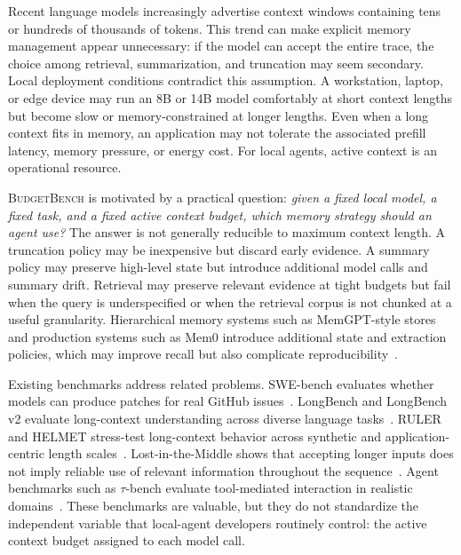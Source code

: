 \documentclass[11pt]{article}
\newcommand{\BudgetBench}{\textsc{BudgetBench}}
\begin{document}
Recent language models increasingly advertise context windows containing tens
or hundreds of thousands of tokens.  This trend can make explicit memory
management appear unnecessary: if the model can accept the entire trace, the
choice among retrieval, summarization, and truncation may seem secondary.
Local deployment conditions contradict this assumption.  A workstation,
laptop, or edge device may run an 8B or 14B model comfortably at short context
lengths but become slow or memory-constrained at longer lengths.  Even when a
long context fits in memory, an application may not tolerate the associated
prefill latency, memory pressure, or energy cost.  For local agents, active
context is an operational resource.

\BudgetBench{} is motivated by a practical question: \emph{given a fixed local
model, a fixed task, and a fixed active context budget, which memory strategy
should an agent use?}  The answer is not generally reducible to maximum context
length.  A truncation policy may be inexpensive but discard early evidence.  A
summary policy may preserve high-level state but introduce additional model
calls and summary drift.  Retrieval may preserve relevant evidence at tight
budgets but fail when the query is underspecified or when the retrieval corpus
is not chunked at a useful granularity.  Hierarchical memory systems such as
MemGPT-style stores and production systems such as Mem0 introduce additional
state and extraction policies, which may improve recall but also complicate
reproducibility~\citep{packer2023memgpt,chhikara2025mem0}.

Existing benchmarks address related problems.  SWE-bench evaluates whether
models can produce patches for real GitHub issues~\citep{jimenez2023swebench}.
LongBench and LongBench v2 evaluate long-context understanding across diverse
language tasks~\citep{bai2023longbench,bai2024longbenchv2}.  RULER and HELMET
stress-test long-context behavior across synthetic and application-centric
length scales~\citep{hsieh2024ruler,yen2024helmet}.  Lost-in-the-Middle shows
that accepting longer inputs does not imply reliable use of relevant
information throughout the sequence~\citep{liu2023lost}.  Agent benchmarks such
as $\tau$-bench evaluate tool-mediated interaction in realistic
domains~\citep{yao2024taubench}.  These benchmarks are valuable, but they do not
standardize the independent variable that local-agent developers routinely
control: the active context budget assigned to each model call.
\end{document}
